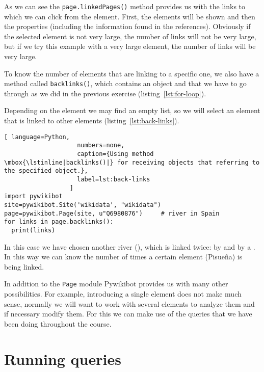 As we can see the \lstinline|page.linkedPages()| method provides us with the links to which we can click from the element. 
First, the elements will be shown and then the properties (including the information found in the references). Obviously if the selected element is not very large, the number of links will not be very large, but if we try this example with a very large element, the number of links will be very large.

To know the number of elements that are linking to a specific one,
we also have a method called \lstinline|backlinks()|, which contains an object and that we have to go through as we did in the previous exercise (listing~\ref{lst:for-loop}).

Depending on the element we may find an empty list, 
so we will select an element 
that is linked to other elements (listing~\ref{lst:back-links}).

\begin{lstlisting}[ language=Python,
                    numbers=none,
                    caption={Using method \mbox{\lstinline|backlinks()|} for receiving objects that referring to the specified object.},
                    label=lst:back-links
                  ]
import pywikibot
site=pywikibot.Site('wikidata', "wikidata")
page=pywikibot.Page(site, u"Q6980876")     # river in Spain
for links in page.backlinks():
  print(links)
\end{lstlisting}

In this case we have chosen another river (), 
which is linked twice: by  and by a . 
In this way we can know the number of times a certain element (Pisueña) is being linked.


In addition to the \lstinline|Page| module Pywikibot provides us with many other possibilities. 
For example, introducing a single element does not make much sense, normally we will want to work with several elements to analyze them and if necessary modify them. For this we can make use of the queries that we have been doing throughout the course.


\section{Running queries}
\label{sec:running-queries}

